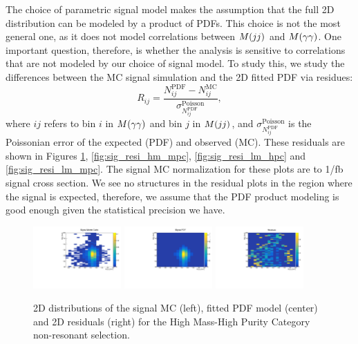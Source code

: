 The choice of parametric signal model makes the assumption that the full 2D distribution can be modeled by a product of PDFs. 
This choice is not the most general one, as it does not model correlations between $M(jj)$ and $M(\gamma\gamma)$. 
One important question, therefore, is whether the analysis is sensitive to correlations that are not modeled by our choice of signal model. 
To study this, we study the differences between the MC signal simulation and the 2D fitted PDF via residues:
\begin{equation}
R_{ij} = \frac{N^{\textrm{PDF}}_{ij} - N^{\textrm{MC}}_{ij}}{\sigma_{N^{\textrm{PDF}}_{ij}}^{\textrm{Poisson}}},
\end{equation}
where $ij$ refers to bin $i$ in $M(\gamma\gamma)$ and bin $j$ in $M(jj)$, and $\sigma_{N^{\textrm{PDF}}_{ij}}^{\textrm{Poisson}}$ is the Poissonian error of the expected (PDF) and observed (MC).  
These residuals are shown in Figures \ref{fig:sig_resi_hm_hpc}, \ref{fig:sig_resi_hm_mpc}, \ref{fig:sig_resi_lm_hpc} and \ref{fig:sig_resi_lm_mpc}.
The signal MC normalization for these plots are to 1/fb signal cross section. 
We see no structures in the residual plots in the region where the signal is expected, therefore, we assume that the PDF product modeling is good enough given the statistical precision we have. 

\begin{figure}[h]
  \centering
\includegraphics[width=0.3\textwidth]{figures/sec-signals/SignalResiduals/h_mc_HM_cat0}\hfil
\includegraphics[width=0.3\textwidth]{figures/sec-signals/SignalResiduals/h_pd_HM_cat0}\hfil
\includegraphics[width=0.3\textwidth]{figures/sec-signals/SignalResiduals/h_re_HM_cat0}\hfil
  \caption{2D distributions of the signal MC (left), fitted PDF model (center) and 2D residuals (right) for the High Mass-High Purity Category non-resonant selection.}
  \label{fig:sig_resi_hm_hpc}
\end{figure}

